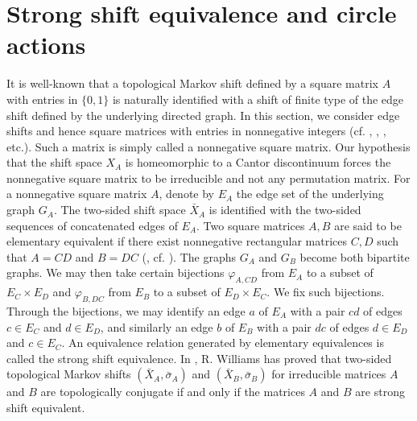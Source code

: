 \documentclass[11pt]{article}
\theoremstyle{plain}
\theoremstyle{definition}
\numberwithin{equation}{section}
\begin{document}
\section{Strong shift equivalence and circle actions}
It is well-known that 
a topological Markov shift
defined by a square matrix $A$ with entries in $\{0,1\}$
is naturally identified with 
a shift of finite type of the edge shift defined by 
the underlying directed graph. 
 In this section,
we consider edge shifts and hence  square matrices
with entries in nonnegative integers 
(cf.  \cite{Kitchens}, \cite{LM}, \cite{Williams}, etc.).
Such a matrix is simply called  a nonnegative square matrix.
Our hypothesis that the shift space $X_A$ is homeomorphic to 
a Cantor discontinuum forces the nonnegative square matrix
to be irreducible and not any permutation matrix.
For a nonnegative square matrix $A$,
denote by $E_A$ the edge set of the underlying graph $G_A$.
The two-sided shift space
$\bar{X}_A$  is identified with  
the two-sided sequences of concatenated edges of $E_A$.    
Two square matrices $A, B$ are said to be elementary equivalent 
if there exist  nonnegative rectangular matrices $C, D$ such that
$A = CD$ and $B=DC$ (\cite{Williams}, cf. \cite{LM}).
The graphs 
$G_A$ and $G_B$ become both bipartite graphs.
We may then take certain  bijections
$\varphi_{A,CD}$
from $E_A$ to a subset of $E_C \times E_D$
and 
$\varphi_{B,DC}$
from $E_B$ to a subset of $E_D \times E_C$.
We fix such bijections.
Through the bijections,
we may identify an edge $a$ of $E_A$ with a pair $cd$ of
edges $c \in E_C$ and $d\in E_D$,
and similarly
an edge $b$ of $E_B$ with a pair $dc$ of
edges $d \in E_D$ and $c\in E_C$.
An equivalence relation generated by elementary equivalences is called 
the strong shift equivalence. 
In \cite{Williams}, R. Williams  
has proved that two-sided topological Markov shifts
$(\bar{X}_A, \bar{\sigma}_A)$
and
$(\bar{X}_B, \bar{\sigma}_B)$
for irreducible matrices $A$ and $B$
are topologically conjugate if and only if 
the matrices $A$ and $B$ are strong shift equivalent.
\end{document}
